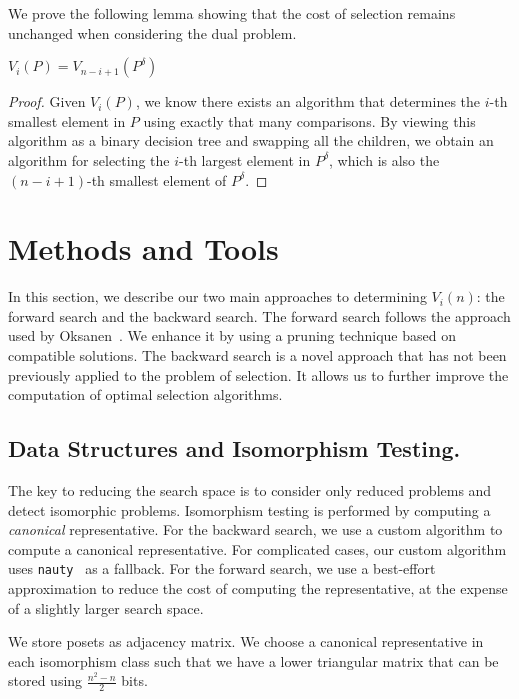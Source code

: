 \documentclass[a4paper,UKenglish,cleveref, autoref, thm-restate]{lipics-v2021}
\newcommand{\dual}[1]{{#1}^{\delta}}
\begin{document}
We prove the following lemma showing that the cost of selection remains unchanged when considering the dual problem.

\begin{lemma} \label{lemma:dual_poset_allowed}
  $V_i(P) = V_{n - i + 1}(\dual{P})$
\end{lemma}

\begin{proof}
  Given $V_i(P)$, we know there exists an algorithm that determines the $i$-th smallest element in $P$ using exactly that many comparisons.
  By viewing this algorithm as a binary decision tree and swapping all the children, we obtain an algorithm for selecting the $i$-th largest element in $\dual{P}$, which is also the $(n - i + 1)$-th smallest element of $\dual{P}$.
\end{proof}

\section{Methods and Tools}

In this section, we describe our two main approaches to determining $V_i(n)$: the forward search and the backward search.
The forward search follows the approach used by Oksanen~\cite{Oksanen2006}.
We enhance it by using a pruning technique based on compatible solutions.
The backward search is a novel approach that has not been previously applied to the problem of selection.
It allows us to further improve the computation of optimal selection algorithms.%

\subsection{Data Structures and Isomorphism Testing.}
The key to reducing the search space is to consider only reduced problems and detect isomorphic problems.
Isomorphism testing is performed by computing a \emph{canonical} representative.
For the backward search, we use a custom algorithm to compute a canonical representative.
For complicated cases, our custom algorithm uses \texttt{nauty}~\cite{MCKAY201494} as a fallback.
For the forward search, we use a best-effort approximation to reduce the cost of computing the representative, at the expense of a slightly larger search space.

We store posets as adjacency matrix.
We choose a canonical representative in each isomorphism class such that we have a lower triangular matrix that can be stored using $\frac{n^2 - n}{2}$ bits.
\end{document}
